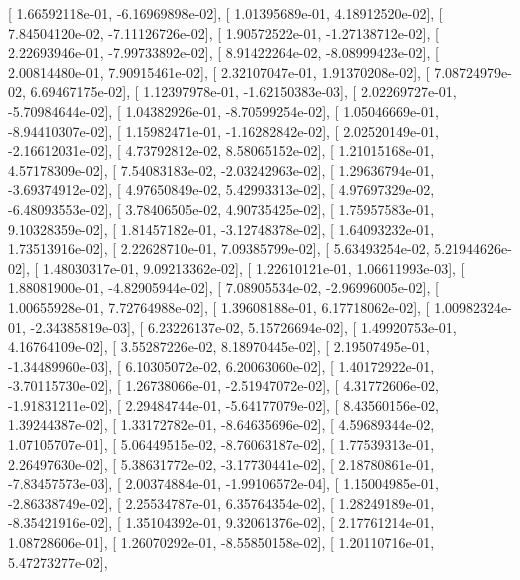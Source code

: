 \documentclass{article}
\begin{document}
       [  1.66592118e-01,  -6.16969898e-02],
       [  1.01395689e-01,   4.18912520e-02],
       [  7.84504120e-02,  -7.11126726e-02],
       [  1.90572522e-01,  -1.27138712e-02],
       [  2.22693946e-01,  -7.99733892e-02],
       [  8.91422264e-02,  -8.08999423e-02],
       [  2.00814480e-01,   7.90915461e-02],
       [  2.32107047e-01,   1.91370208e-02],
       [  7.08724979e-02,   6.69467175e-02],
       [  1.12397978e-01,  -1.62150383e-03],
       [  2.02269727e-01,  -5.70984644e-02],
       [  1.04382926e-01,  -8.70599254e-02],
       [  1.05046669e-01,  -8.94410307e-02],
       [  1.15982471e-01,  -1.16282842e-02],
       [  2.02520149e-01,  -2.16612031e-02],
       [  4.73792812e-02,   8.58065152e-02],
       [  1.21015168e-01,   4.57178309e-02],
       [  7.54083183e-02,  -2.03242963e-02],
       [  1.29636794e-01,  -3.69374912e-02],
       [  4.97650849e-02,   5.42993313e-02],
       [  4.97697329e-02,  -6.48093553e-02],
       [  3.78406505e-02,   4.90735425e-02],
       [  1.75957583e-01,   9.10328359e-02],
       [  1.81457182e-01,  -3.12748378e-02],
       [  1.64093232e-01,   1.73513916e-02],
       [  2.22628710e-01,   7.09385799e-02],
       [  5.63493254e-02,   5.21944626e-02],
       [  1.48030317e-01,   9.09213362e-02],
       [  1.22610121e-01,   1.06611993e-03],
       [  1.88081900e-01,  -4.82905944e-02],
       [  7.08905534e-02,  -2.96996005e-02],
       [  1.00655928e-01,   7.72764988e-02],
       [  1.39608188e-01,   6.17718062e-02],
       [  1.00982324e-01,  -2.34385819e-03],
       [  6.23226137e-02,   5.15726694e-02],
       [  1.49920753e-01,   4.16764109e-02],
       [  3.55287226e-02,   8.18970445e-02],
       [  2.19507495e-01,  -1.34489960e-03],
       [  6.10305072e-02,   6.20063060e-02],
       [  1.40172922e-01,  -3.70115730e-02],
       [  1.26738066e-01,  -2.51947072e-02],
       [  4.31772606e-02,  -1.91831211e-02],
       [  2.29484744e-01,  -5.64177079e-02],
       [  8.43560156e-02,   1.39244387e-02],
       [  1.33172782e-01,  -8.64635696e-02],
       [  4.59689344e-02,   1.07105707e-01],
       [  5.06449515e-02,  -8.76063187e-02],
       [  1.77539313e-01,   2.26497630e-02],
       [  5.38631772e-02,  -3.17730441e-02],
       [  2.18780861e-01,  -7.83457573e-03],
       [  2.00374884e-01,  -1.99106572e-04],
       [  1.15004985e-01,  -2.86338749e-02],
       [  2.25534787e-01,   6.35764354e-02],
       [  1.28249189e-01,  -8.35421916e-02],
       [  1.35104392e-01,   9.32061376e-02],
       [  2.17761214e-01,   1.08728606e-01],
       [  1.26070292e-01,  -8.55850158e-02],
       [  1.20110716e-01,   5.47273277e-02],
\end{document}
